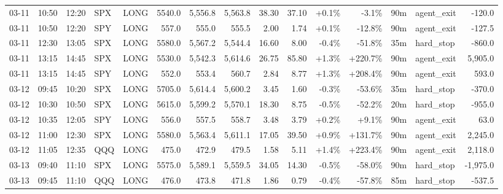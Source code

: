 \documentclass[11pt,a4paper,twoside]{article}
\begin{document}
\begin{landscape}
\begin{center}
\begin{longtable}{>{\color{txtmain}}l l l l l r r r r r r r r >{\color{txtmain}}l r}
03-11 & 10:50 & 12:20 & SPX & LONG & 5540.0 & 5,556.8 & 5,563.8 & 38.30 & 37.10 & \textcolor{wingreen}{+0.1\%} & \textcolor{lossred}{-3.1\%} & 90m & agent\_exit & \textcolor{lossred}{-120.0} \\
03-11 & 10:50 & 12:20 & SPY & LONG & 557.0 & 555.0 & 555.5 & 2.00 & 1.74 & \textcolor{wingreen}{+0.1\%} & \textcolor{lossred}{-12.8\%} & 90m & agent\_exit & \textcolor{lossred}{-127.5} \\
03-11 & 12:30 & 13:05 & SPX & LONG & 5580.0 & 5,567.2 & 5,544.4 & 16.60 & 8.00 & \textcolor{lossred}{-0.4\%} & \textcolor{lossred}{-51.8\%} & 35m & hard\_stop & \textcolor{lossred}{-860.0} \\
03-11 & 13:15 & 14:45 & SPX & LONG & 5530.0 & 5,542.3 & 5,614.6 & 26.75 & 85.80 & \textcolor{wingreen}{+1.3\%} & \textcolor{wingreen}{+220.7\%} & 90m & agent\_exit & \textcolor{wingreen}{5,905.0} \\
03-11 & 13:15 & 14:45 & SPY & LONG & 552.0 & 553.4 & 560.7 & 2.84 & 8.77 & \textcolor{wingreen}{+1.3\%} & \textcolor{wingreen}{+208.4\%} & 90m & agent\_exit & \textcolor{wingreen}{593.0} \\
03-12 & 09:45 & 10:20 & SPX & LONG & 5705.0 & 5,614.4 & 5,600.2 & 3.45 & 1.60 & \textcolor{lossred}{-0.3\%} & \textcolor{lossred}{-53.6\%} & 35m & hard\_stop & \textcolor{lossred}{-370.0} \\
03-12 & 10:30 & 10:50 & SPX & LONG & 5615.0 & 5,599.2 & 5,570.1 & 18.30 & 8.75 & \textcolor{lossred}{-0.5\%} & \textcolor{lossred}{-52.2\%} & 20m & hard\_stop & \textcolor{lossred}{-955.0} \\
03-12 & 10:35 & 12:05 & SPY & LONG & 556.0 & 557.5 & 558.7 & 3.48 & 3.79 & \textcolor{wingreen}{+0.2\%} & \textcolor{wingreen}{+9.1\%} & 90m & agent\_exit & \textcolor{wingreen}{63.0} \\
03-12 & 11:00 & 12:30 & SPX & LONG & 5580.0 & 5,563.4 & 5,611.1 & 17.05 & 39.50 & \textcolor{wingreen}{+0.9\%} & \textcolor{wingreen}{+131.7\%} & 90m & agent\_exit & \textcolor{wingreen}{2,245.0} \\
03-12 & 11:05 & 12:35 & QQQ & LONG & 475.0 & 472.9 & 479.5 & 1.58 & 5.11 & \textcolor{wingreen}{+1.4\%} & \textcolor{wingreen}{+223.4\%} & 90m & agent\_exit & \textcolor{wingreen}{2,118.0} \\
03-13 & 09:40 & 11:10 & SPX & LONG & 5575.0 & 5,589.1 & 5,559.5 & 34.05 & 14.30 & \textcolor{lossred}{-0.5\%} & \textcolor{lossred}{-58.0\%} & 90m & hard\_stop & \textcolor{lossred}{-1,975.0} \\
03-13 & 09:45 & 11:10 & QQQ & LONG & 476.0 & 473.8 & 471.8 & 1.86 & 0.79 & \textcolor{lossred}{-0.4\%} & \textcolor{lossred}{-57.8\%} & 85m & hard\_stop & \textcolor{lossred}{-537.5} \\

\end{longtable}
\end{center}
\end{landscape}
\end{document}
